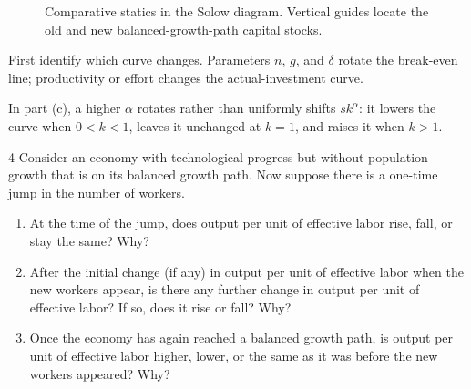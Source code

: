\begin{solution}
\begin{figure}[H]
    \caption{Comparative statics in the Solow diagram. Vertical guides locate the
    old and new balanced-growth-path capital stocks.}
\end{figure}
\end{solution}

\begin{note}
    First identify which curve changes. Parameters \(n\), \(g\), and \(\delta\) rotate
    the break-even line; productivity or effort changes the actual-investment curve.
\end{note}

\begin{note}
    In part (c), a higher \(\alpha\) rotates rather than uniformly shifts \(sk^\alpha\):
    it lowers the curve when \(0<k<1\), leaves it unchanged at \(k=1\), and raises it
    when \(k>1\).
\end{note}

\begin{problem}{4}
Consider an economy with technological progress but without population growth that is on its balanced
growth path. Now suppose there is a one-time jump in the number of workers.
\begin{enumerate}[label=(\alph*)]
    \item At the time of the jump, does output per unit of effective labor rise, fall, or stay
    the same? Why?
    \item After the initial change (if any) in output per unit of effective labor when the new
    workers appear, is there any further change in output per unit of effective labor? If so,
    does it rise or fall? Why?
    \item Once the economy has again reached a balanced growth path, is output per unit of
    effective labor higher, lower, or the same as it was before the new workers appeared? Why?
\end{enumerate}
\end{problem}

